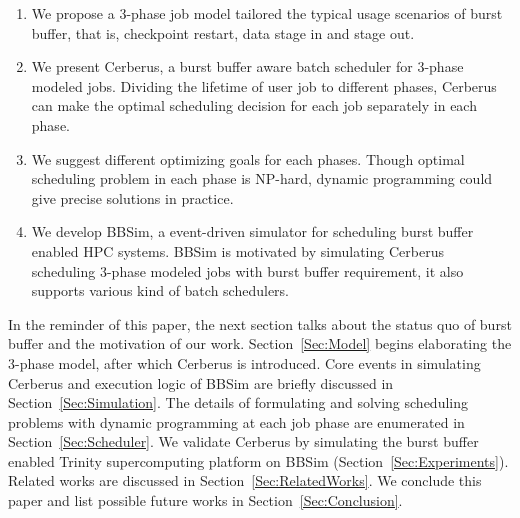 \begin{enumerate}
        \item %
                We propose a 3-phase job model tailored the typical
                usage scenarios of burst buffer, that is, checkpoint restart,
                data stage in and stage out.
        \item   We present Cerberus,
                a burst buffer aware batch scheduler for 3-phase modeled jobs.
                Dividing the lifetime of user job to different phases,
                Cerberus can make the optimal scheduling decision 
                for each job separately in each phase.
        \item   We suggest different optimizing goals for each phases.
                Though optimal scheduling problem in each phase is NP-hard,
                dynamic programming could give precise solutions
                in practice.
        \item   We develop BBSim, a event-driven simulator for scheduling
                burst buffer enabled HPC systems.
                BBSim is motivated by simulating Cerberus scheduling 
                3-phase modeled jobs with burst buffer requirement,
                it also supports various kind of batch schedulers.
\end{enumerate}


In the reminder of this paper,
the next section talks about the status quo of burst buffer and
the motivation of our work.
Section~\ref{Sec:Model} begins elaborating the 3-phase model,
after which Cerberus is introduced.
Core events in simulating Cerberus and execution logic of BBSim are
briefly discussed in Section~\ref{Sec:Simulation}.
The details of formulating and solving scheduling problems with
dynamic programming at each job phase are enumerated in Section~\ref{Sec:Scheduler}.
We validate Cerberus by simulating the burst buffer enabled
Trinity supercomputing platform on BBSim (Section~\ref{Sec:Experiments}).
Related works are discussed in Section~\ref{Sec:RelatedWorks}.
We conclude this paper and list possible future works in Section~\ref{Sec:Conclusion}.

